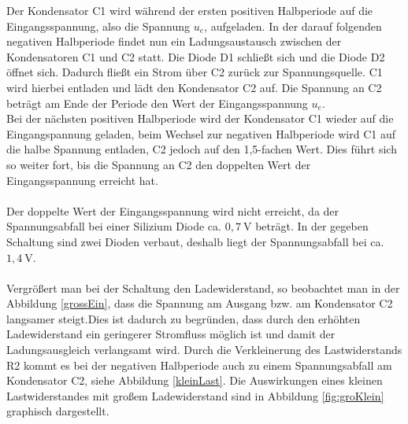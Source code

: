 Der Kondensator C1 wird während der ersten positiven Halbperiode auf die Eingangsspannung, also die Spannung $u_{e}$, aufgeladen. In der darauf folgenden negativen Halbperiode findet nun ein Ladungsaustausch zwischen der Kondensatoren C1 und C2 statt. Die Diode D1 schließt sich und die Diode D2 öffnet sich. Dadurch fließt ein Strom über C2 zurück zur Spannungsquelle. C1 wird hierbei entladen und lädt den Kondensator C2 auf. Die Spannung an C2 beträgt am Ende der Periode den Wert der Eingangsspannung $u_{e}$. \\
Bei der nächsten positiven Halbperiode wird der Kondensator C1 wieder auf die Eingangspannung geladen, beim Wechsel zur negativen Halbperiode wird C1 auf die halbe Spannung entladen, C2 jedoch auf den 1,5-fachen Wert. Dies führt sich so weiter fort, bis die Spannung an C2 den doppelten Wert der Eingangsspannung erreicht hat.
\\ \\
Der doppelte Wert der Eingangsspannung wird nicht erreicht, da der Spannungsabfall bei einer Silizium Diode ca. $0,7\:$\si{\volt} beträgt. In der gegeben Schaltung sind zwei Dioden verbaut, deshalb liegt der Spannungsabfall bei ca. $1,4\:$\si{\volt}. 
\\ \\ 
Vergrößert man bei der Schaltung den Ladewiderstand, so beobachtet man in der Abbildung \ref{grossEin}, dass die Spannung am Ausgang bzw. am Kondensator C2 langsamer steigt.Dies ist dadurch zu begründen, dass durch den erhöhten Ladewiderstand ein geringerer Stromfluss möglich ist und damit der Ladungsausgleich verlangsamt wird. Durch die Verkleinerung des Lastwiderstands R2 kommt es bei der negativen Halbperiode auch zu einem Spannungsabfall am Kondensator C2, siehe Abbildung \ref{kleinLast}. Die Auswirkungen eines kleinen Lastwiderstandes mit großem Ladewiderstand sind in Abbildung \ref{fig:groKlein} graphisch dargestellt.

